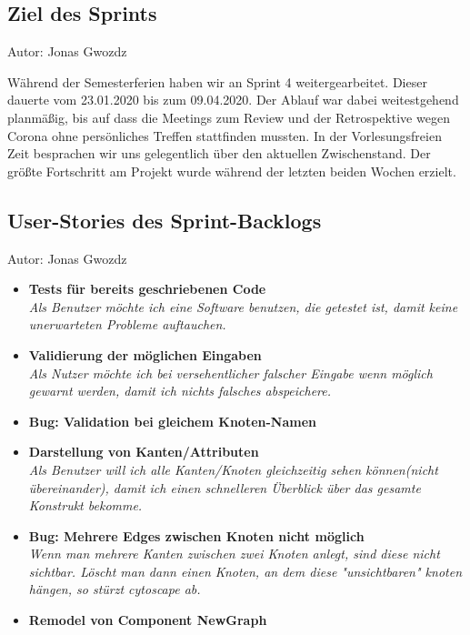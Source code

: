 \subsection{Ziel des Sprints}
{\small Autor: Jonas Gwozdz}

Während der Semesterferien haben wir an Sprint 4 weitergearbeitet. Dieser dauerte vom 23.01.2020 bis zum  09.04.2020. Der Ablauf war dabei weitestgehend planmäßig, bis auf dass die Meetings zum Review und der Retrospektive wegen Corona ohne persönliches Treffen stattfinden mussten.
In der Vorlesungsfreien Zeit besprachen wir uns gelegentlich über den aktuellen Zwischenstand. Der größte Fortschritt am Projekt wurde während der letzten beiden Wochen erzielt.

\subsection{User-Stories des Sprint-Backlogs}
{\small Autor: Jonas Gwozdz}

\begin{itemize}
  \item \textbf{Tests für bereits geschriebenen Code}
        \\\textit{Als Benutzer möchte ich eine Software benutzen, die getestet ist, damit keine unerwarteten Probleme auftauchen.}
  \item \textbf{ Validierung der möglichen Eingaben }
        \\\textit{
          Als Nutzer möchte ich bei versehentlicher falscher Eingabe wenn möglich gewarnt werden, damit ich nichts falsches abspeichere.}
  \item \textbf{Bug: Validation bei gleichem Knoten-Namen}
  \item \textbf{Darstellung von Kanten/Attributen }
        \\\textit{
          Als Benutzer will ich alle Kanten/Knoten gleichzeitig sehen können(nicht übereinander), damit ich einen schnelleren Überblick über das gesamte Konstrukt bekomme.}
  \item \textbf{Bug: Mehrere Edges zwischen Knoten nicht möglich}
        \\\textit{
          Wenn man mehrere Kanten zwischen zwei Knoten anlegt, sind diese nicht sichtbar. Löscht man dann einen Knoten, an dem diese "unsichtbaren" knoten hängen, so stürzt cytoscape ab.}
  \item \textbf{Remodel von Component NewGraph}
\end{itemize}

